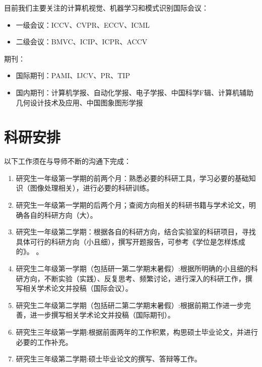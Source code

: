 \documentclass[a4paper，12pt]{article}
\begin{document}
目前我们主要关注的计算机视觉、机器学习和模式识别国际会议：

\begin{itemize}

\item 一级会议：ICCV、CVPR、ECCV、ICML

\item 二级会议：BMVC、ICIP、ICPR、ACCV

\end{itemize}

期刊：

\begin{itemize}

\item 国际期刊：PAMI、IJCV、PR、TIP

\item 国内期刊：计算机学报、自动化学报、电子学报、中国科学F辑、计算机辅助几何设计技术及应用、中国图象图形学报

\end{itemize}

\section{科研安排}

以下工作须在与导师不断的沟通下完成：

\begin{enumerate}

\item 研究生一年级第一学期的前两个月：熟悉必要的科研工具，学习必要的基础知识（图像处理相关），进行必要的科研训练。

\item 研究生一年级第一学期的后两个月；查阅方向相关的科研书籍与学术论文，明确各自的科研方向（大）。

\item 研究生一年级第二学期：根据各自的科研方向，结合实验室的科研项目，寻找具体可行的科研方向（小且细），撰写开题报告，可参考《学位是怎样炼成的》。
。

\item 研究生二年级第一学期（包括研一第二学期末暑假）:根据所明确的小且细的科研方向，不断实验（实践）、反复思考、频繁讨论，进行深入的科研工作，撰写相关学术论文并投稿（国际会议）。

\item 研究生二年级第二学期（包括研二第二学期末暑假）:根据前期工作进一步完善，进一步撰写相关学术论文并投稿（国际期刊）。

\item 研究生三年级第一学期:根据前面两年的工作积累，构思硕士毕业论文，并进行必要的工作补充。

\item 研究生三年级第二学期:硕士毕业论文的撰写、答辩等工作。

\end{enumerate}
\end{document}

